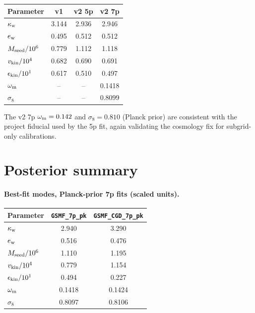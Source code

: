 \documentclass{article}
\begin{document}
\begin{center}
\begin{tabular}{lccc}
\toprule
Parameter                 & v1    & v2 5p  & v2 7p \\
\midrule
$\kappa_{\rm w}$          & 3.144 & 2.936  & 2.946 \\
$e_{\rm w}$               & 0.495 & 0.512  & 0.512 \\
$M_{\rm seed}/10^6$       & 0.779 & 1.112  & 1.118 \\
$v_{\rm kin}/10^4$        & 0.682 & 0.690  & 0.691 \\
$\epsilon_{\rm kin}/10^1$ & 0.617 & 0.510  & 0.497 \\
$\omega_{\rm m}$          & --    & --     & 0.1418 \\
$\sigma_8$                & --    & --     & 0.8099 \\
\bottomrule
\end{tabular}
\end{center}

The v2 7p $\omega_{\rm m}=0.142$ and $\sigma_8=0.810$ (Planck prior) are
consistent with the project fiducial used by the 5p fit, again validating the
cosmology fix for subgrid-only calibrations.

\FloatBarrier

\section{Posterior summary}

\paragraph{Best-fit modes, Planck-prior 7p fits (scaled units).}

\begin{center}
\begin{tabular}{lcc}
\toprule
Parameter                 & \texttt{GSMF\_7p\_pk} & \texttt{GSMF\_CGD\_7p\_pk} \\
\midrule
$\kappa_{\rm w}$          & 2.940 & 3.290 \\
$e_{\rm w}$               & 0.516 & 0.476 \\
$M_{\rm seed}/10^6$       & 1.110 & 1.195 \\
$v_{\rm kin}/10^4$        & 0.779 & 1.154 \\
$\epsilon_{\rm kin}/10^1$ & 0.494 & 0.227 \\
$\omega_{\rm m}$          & 0.1418 & 0.1424 \\
$\sigma_8$                & 0.8097 & 0.8106 \\
\bottomrule
\end{tabular}
\end{center}
\end{document}
